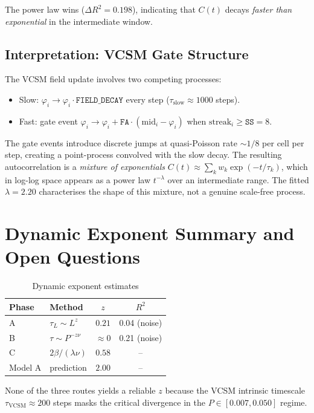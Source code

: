 \documentclass[11pt,a4paper]{article}
\begin{document}
The power law wins ($\Delta R^2=0.198$), indicating that $C(t)$ decays
\emph{faster than exponential} in the intermediate window.

\subsection{Interpretation: VCSM Gate Structure}

The VCSM field update involves two competing processes:
\begin{itemize}
\item Slow: $\varphi_i\to\varphi_i\cdot\texttt{FIELD\_DECAY}$ every step
  ($\tau_\mathrm{slow}\approx1000$ steps).
\item Fast: gate event $\varphi_i\to\varphi_i + \texttt{FA}\cdot(\text{mid}_i-\varphi_i)$
  when $\mathrm{streak}_i\geq\texttt{SS}=8$.
\end{itemize}
The gate events introduce discrete jumps at quasi-Poisson rate $\sim1/8$ per cell
per step, creating a point-process convolved with the slow decay.  The resulting
autocorrelation is a \emph{mixture of exponentials}
$C(t)\approx\sum_k w_k\exp(-t/\tau_k)$, which in log-log space appears as a
power law $t^{-\lambda}$ over an intermediate range.
The fitted $\lambda=2.20$ characterises the shape of this mixture, not a genuine
scale-free process.

\section{Dynamic Exponent Summary and Open Questions}

\begin{table}[h]
\centering
\caption{Dynamic exponent estimates}
\label{tab:z}
\begin{tabular}{llcc}
\toprule
Phase & Method & $z$ & $R^2$ \\
\midrule
A & $\tau_L\sim L^z$ & $0.21$ & 0.04 (noise) \\
B & $\tau\sim P^{-z\nu}$ & $\approx0$ & 0.21 (noise) \\
C & $2\beta/(\lambda\nu)$ & $0.58$ & -- \\
Model A & prediction & $2.00$ & -- \\
\bottomrule
\end{tabular}
\end{table}

None of the three routes yields a reliable $z$ because the VCSM intrinsic timescale
$\tau_\mathrm{VCSM}\approx200$ steps masks the critical divergence in the
$P\in[0.007,0.050]$ regime.
\end{document}

